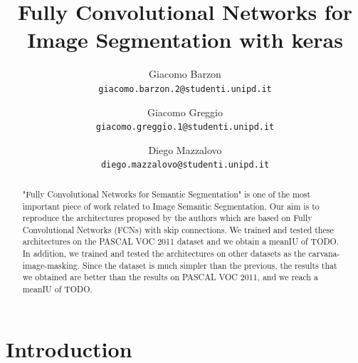 \documentclass[10pt,twocolumn,letterpaper]{article}
\begin{document}
\title{Fully Convolutional Networks for Image Segmentation with keras}

\author{Giacomo Barzon\\
{\tt\small giacomo.barzon.2@studenti.unipd.it}
\and
Giacomo Greggio\\
{\tt\small giacomo.greggio.1@studenti.unipd.it}
\and
Diego Mazzalovo\\
{\tt\small diego.mazzalovo@studenti.unipd.it}
}
\maketitle

\begin{abstract}
	"Fully Convolutional Networks for Semantic Segmentation"\cite{projectPaper} is one of the most important piece of work related to Image Semantic Segmentation. Our aim is to reproduce the architectures proposed by the authors which are based on Fully Convolutional Networks (FCNs) with skip connections.
	We trained and tested these architectures on the PASCAL VOC 2011 dataset and we obtain a meanIU of TODO. In addition, we trained and tested the architectures on other datasets as the carvana-image-masking. Since the dataset is much simpler than the previous, the results that we obtained are better than the results on PASCAL VOC 2011, and we reach a meanIU of TODO.
\end{abstract}

\section{Introduction}
\end{document}
